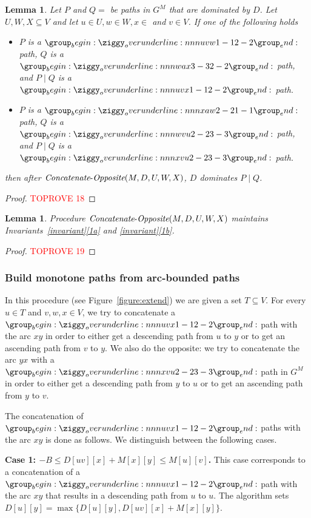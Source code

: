 \documentclass[11pt]{article}
\newtheorem{lemma}[theorem]{Lemma}
\newcommand{\CO}{\mbox{{\it Concatenate}-{\it Opposite}}}
\begin{document}
\begin{lemma}\label{lemma:concat-opposite-bounded}
    Let $P$ and $Q = $ be paths in $G^M$ that are dominated by $D$. Let $U,W,X\subseteq V$ and let $u\in U,w\in W,x\in $ and $v \in V$. If one of the following holds
    \begin{itemize}
        \item $P$ is a $\overunderline{uvw}{1-1}{2-2}$ path, $Q$ is a $\overunderline{wax}{3-3}{2-2}$ path, and $P\mid Q$ is a $\overunderline{uvx}{1-1}{2-2}$ path.
        \item $P$ is a $\overunderline{xaw}{2-2}{1-1}$ path, $Q$ is a $\overunderline{wvu}{2-2}{3-3}$ path, and $P\mid Q$ is a $\overunderline{xvu}{2-2}{3-3}$ path.
    \end{itemize}
    then after $\CO(M,D,U,W,X)$, $D$ dominates $P \mid Q$.
\end{lemma}

\begin{proof}\textcolor{red}{TOPROVE 18}\end{proof}


\begin{lemma}\label{lemma:concat-opposite-invariant}
    Procedure $\CO(M,D,U,W,X)$ maintains Invariants~\ref{invariant}\ref{1a} and \ref{invariant}\ref{1b}.
\end{lemma}

\begin{proof}\textcolor{red}{TOPROVE 19}\end{proof}


\subsubsection{Build monotone paths from arc-bounded paths}\label{sec:extend}
In this procedure (see Figure~\ref{figure:extend}) we are given a set $T\subseteq V$. For every $u\in T$ and $v,w,x\in V$, we try to concatenate a $\overunderline{uvx}{1-1}{2-2}$ path with the arc $xy$ in order to either get a descending path from $u$ to $y$ or to get an ascending path from $v$ to $y$. 
We also do the opposite:
we try to concatenate the arc $yx$ with a $\overunderline{xvu}{2-2}{3-3}$ path in $G^M$ in order to either get a descending path from $y$ to $u$ or to get an ascending path from $y$ to $v$.

The concatenation of $\overunderline{uvx}{1-1}{2-2}$ paths with the arc $xy$ is done as follows. We distinguish between the following cases.

\textbf{Case 1: $-B \le D[uv][x]+M[x][y]\le M[u][v]$.}
This case corresponds to a concatenation of a $\overunderline{uvx}{1-1}{2-2}$ path with the arc $xy$ that results in a descending path from $u$ to $u$. The algorithm sets $D[u][y] = \max \{   D[u][y],D[uv][x]+M[x][y]\}$.
\end{document}
